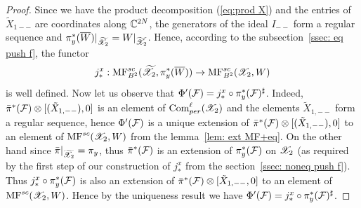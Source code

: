 \begin{proof}
Since we have the product decomposition (\ref{eq:prod X}) and the entries of \(\tilde{X}_{1--}\)  are coordinates along \(\mathbb{C}^{2N}\),
the generators of the ideal $I_{--}$ form a regular sequence and $\pi_y^*(\overline{W})|_{\widetilde{\mathscr{X}}_2}=W|_{\widetilde{\mathscr{X}_2}}$.
Hence, according to the subsection~\ref{ssec: eq push f}, the functor \[j^x_*: \mathrm{MF}^{sc}_{B^2}(\widetilde{\mathscr{X}}_2,\pi_y^*(\overline{W}))\to \mathrm{MF}^{sc}_{B^2}(\mathscr{X}_2,W)\] is
well defined.
Now let us observe that $\Phi'(\mathcal{F})=j^x_*\circ \pi_y^*(\mathcal{F})^\sharp$. Indeed, $\bar{\pi}^*(\mathcal{F})\otimes [(\tilde{X}_{1,--}),0]$ is an element of 
$\textup{Com}_{per}^\ell(\mathscr{X}_2)$ and the elements $\tilde{X}_{1,--}$ form a regular sequence, hence $\Phi'(\mathcal{F})$ is a unique extension of
$\bar{\pi}^*(\mathcal{F})\otimes [(\tilde{X}_{1,--}),0]$ to an element of $\mathrm{MF}^{sc}(\mathscr{X}_2,W)$ from the lemma~\ref{lem: ext MF+eq}.
On the other hand since $\bar{\pi}|_{\widetilde{\mathscr{X}_2}}=\pi_y$, thus $\bar{\pi}^*(\mathcal{F})$ is an extension of $\pi_y^*(\mathcal{F})$ on $\mathscr{X}_2$ (as required by 
the first step of our construction of $j_*^x$ from the  section~\ref{ssec: noneq push f}). Thus $j_*^x\circ\pi_y^*(\mathcal{F})$ is also an extension of
$\bar{\pi}^*(\mathcal{F})\otimes [\tilde{X}_{1,--},0]$ to an element of $\mathrm{MF}^{sc}(\mathscr{X}_2,W)$. Hence by the uniqueness result we have $\Phi'(\mathcal{F})=j_*^x\circ\pi_y^*(\mathcal{F})^\sharp$.
 






\end{proof}
